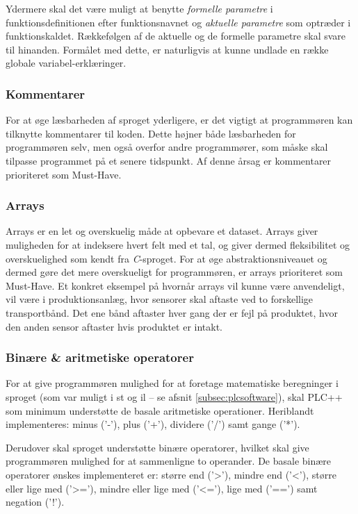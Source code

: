 Ydermere skal det være muligt at benytte \textit{formelle parametre} i funktionsdefinitionen efter funktionsnavnet og \textit{aktuelle parametre} som optræder i funktionskaldet. Rækkefølgen af de aktuelle og de formelle parametre skal svare til hinanden. Formålet med dette, er naturligvis at kunne undlade en række globale variabel-erklæringer. 

\subsubsection{Kommentarer}
For at øge læsbarheden af sproget yderligere, er det vigtigt at programmøren kan tilknytte kommentarer til koden. Dette højner både læsbarheden for programmøren selv, men også overfor andre programmører, som måske skal tilpasse programmet på et senere tidspunkt. Af denne årsag er kommentarer prioriteret som Must-Have. 

\subsubsection{Arrays}
Arrays er en let og overskuelig måde at opbevare et dataset. Arrays giver muligheden for at indeksere hvert felt med et tal, og giver dermed fleksibilitet og overskuelighed som kendt fra \textit{C}-sproget. For at øge abstraktionsniveauet og dermed gøre det mere overskueligt for programmøren, er arrays prioriteret som Must-Have. Et konkret eksempel på hvornår arrays vil kunne være anvendeligt, vil være i produktionsanlæg, hvor sensorer skal aftaste ved to forskellige transportbånd. Det ene bånd aftaster hver gang der er fejl på produktet, hvor den anden sensor aftaster hvis produktet er intakt. 

\subsubsection{Binære \& aritmetiske operatorer} 
For at give programmøren mulighed for at foretage matematiske beregninger i sproget (som var muligt i \gls{st} og \gls{il} – se afsnit \ref{subsec:plcsoftware}), skal PLC++ som minimum understøtte de basale aritmetiske operationer. Heriblandt implementeres: minus ('-'), plus ('+'), dividere ('/') samt gange ('*').

Derudover skal sproget understøtte binære operatorer, hvilket skal give programmøren mulighed for at sammenligne to operander. De basale binære operatorer ønskes implementeret er: større end ('>'), mindre end ('<'), større eller lige med ('>='), mindre eller lige med ('<='), lige med ('==') samt negation ('!').

